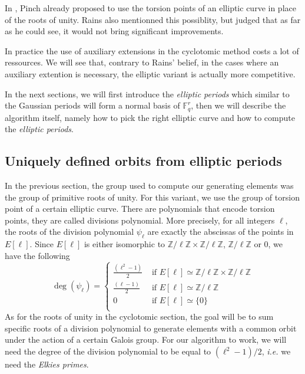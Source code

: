 \documentclass[12pt]{article}
\theoremstyle{plain}
\theoremstyle{definition}
\def\Z{\ensuremath{\mathbb{Z}}}
\def\F{\ensuremath{\mathbb{F}}}
\newcounter{algorithm}
\begin{document}
In \cite{Pinch}, Pinch already proposed to use the torsion points of an elliptic
curve in place of the roots of unity. Rains also mentionned this possiblity, 
but judged that as far as he could see, it would not bring significant 
improvements.
 
In practice the use of auxiliary extensions in the cyclotomic method costs a
lot of ressources. We will see that, contrary to Rains' belief, in the cases 
where an auxiliary extention is necessary, the elliptic variant is actually more 
competitive.

In the next sections, we will first introduce the \emph{elliptic periods} which 
similar to the Gaussian periods will form a normal basis of $\F_q^r$, then we will 
describe the algorithm itself, namely how to pick the right elliptic curve and
how to compute the \emph{elliptic periods}.
 
\subsection{Uniquely defined orbits from elliptic periods}

In the previous section, the group used to compute our generating elements was
the group of primitive roots of unity. For this variant, we use the group of
torsion point of a certain elliptic curve. There are polynomials that encode 
torsion points, they are called divisions polynomial. More precisely, for
all integers $\ell$, the roots of the division polynomial $\psi_\ell$ are exactly the 
abscissas of the points in $E[\ell]$. Since $E[\ell]$ is either isomorphic to 
$\Z/\ell\Z\times\Z/\ell\Z$, $\Z/\ell\Z$ or $0$, we have the following
\begin{equation}
\deg(\psi_\ell) = \begin{cases}
   \tfrac{(\ell^2-1)}{2} &\text{ if }E[\ell]\simeq\Z/\ell\Z\times\Z/\ell\Z\\
   \tfrac{(\ell-1)}{2} &\text{ if }E[\ell]\simeq\Z/\ell\Z\\
   0 &\text{ if } E[\ell]\simeq\lbrace{0}\rbrace\\
\end{cases}
\end{equation}
As for the roots of unity in the cyclotomic section, the goal will be to sum
specific roots of a division polynomial to generate elements with a common orbit
under the action of a certain Galois group. For our algorithm to work, we will 
need the degree of the division polynomial to be equal to $(\ell^2 - 1)/2$,
\emph{i.e.} we need the \emph{Elkies primes}.
\end{document}
